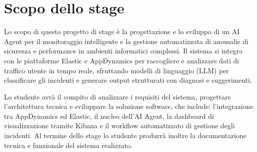 \section*{Scopo dello stage}
Lo scopo di questo progetto di stage è la progettazione e lo sviluppo di un AI Agent per il monitoraggio intelligente e la gestione automatizzata di anomalie di sicurezza e performance in ambienti informatici complessi. Il sistema si integra con le piattaforme Elastic e AppDynamics per raccogliere e analizzare dati di traffico utente in tempo reale, sfruttando modelli di linguaggio (LLM) per classificare gli incidenti e generare output strutturati con diagnosi e suggerimenti.

Lo studente avrà il compito di analizzare i requisiti del sistema, progettare l'architettura tecnica e sviluppare la soluzione software, che include: l'integrazione tra AppDynamics ed Elastic, il nucleo dell'AI Agent, la dashboard di visualizzazione tramite Kibana e il workflow automatizzato di gestione degli incidenti. Al termine dello stage lo studente produrrà inoltre la documentazione tecnica e funzionale del sistema realizzato.

